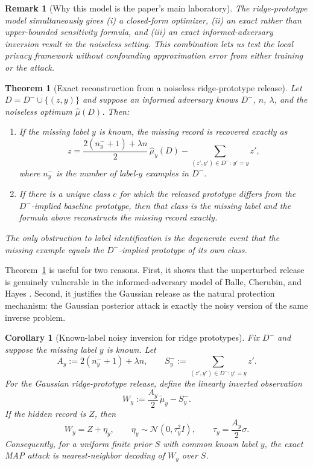 \documentclass[conference,compsoc]{IEEEtran}
\newtheorem{theorem}{Theorem}
\newtheorem{corollary}{Corollary}
\newtheorem{remark}{Remark}
\begin{document}
\begin{remark}[Why this model is the paper's main laboratory]
The ridge-prototype model simultaneously gives (i) a closed-form optimizer, (ii) an exact rather than upper-bounded sensitivity formula, and (iii) an exact informed-adversary inversion result in the noiseless setting. This combination lets us test the local privacy framework without confounding approximation error from either training or the attack.
\end{remark}

\begin{theorem}[Exact reconstruction from a noiseless ridge-prototype release]
\label{thm:proto-exact-recon}
Let $D=D^-\cup\{(z,y)\}$ and suppose an informed adversary knows $D^-$, $n$, $\lambda$, and the noiseless optimum $\widehat\mu(D)$. Then:
\begin{enumerate}[leftmargin=1.4em]
    \item If the missing label $y$ is known, the missing record is recovered exactly as
    \[
    z=\frac{2(n_y^-+1)+\lambda n}{2}\,\widehat\mu_y(D)-\sum_{(z',y')\in D^-:\,y'=y} z',
    \]
    where $n_y^-$ is the number of label-$y$ examples in $D^-$.
    \item If there is a unique class $c$ for which the released prototype differs from the $D^-$-implied baseline prototype,
    then that class is the missing label and the formula above reconstructs the missing record exactly.
\end{enumerate}
The only obstruction to label identification is the degenerate event that the missing example equals the $D^-$-implied prototype of its own class.
\end{theorem}

Theorem~\ref{thm:proto-exact-recon} is useful for two reasons. First, it shows that the unperturbed release is genuinely vulnerable in the informed-adversary model of Balle, Cherubin, and Hayes \cite{balle2022informed}. Second, it justifies the Gaussian release as the natural protection mechanism: the Gaussian posterior attack is exactly the noisy version of the same inverse problem.

\begin{corollary}[Known-label noisy inversion for ridge prototypes]
\label{cor:ridge-noisy-inversion}
Fix $D^-$ and suppose the missing label $y$ is known. Let
\[
A_y:=2(n_y^-+1)+\lambda n,
\qquad
S_y^-:=\sum_{(z',y')\in D^-:y'=y}z'.
\]
For the Gaussian ridge-prototype release, define the linearly inverted observation
\[
W_y:=\frac{A_y}{2}\,\widetilde\mu_y-S_y^-.
\]
If the hidden record is $Z$, then
\[
W_y=Z+\eta_y,
\qquad
\eta_y\sim\mathcal N\!\left(0,\tau_y^2 I\right),
\qquad
\tau_y=\frac{A_y}{2}\sigma.
\]
Consequently, for a uniform finite prior $S$ with common known label $y$, the exact MAP attack is nearest-neighbor decoding of $W_y$ over $S$.
\end{corollary}
\end{document}
